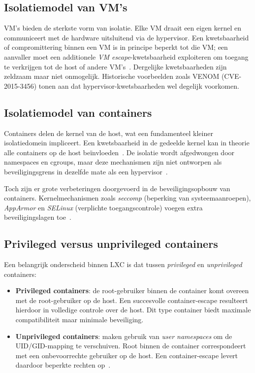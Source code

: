 \subsection{Isolatiemodel van VM's}
\label{subsec:isolatie-vms}

VM's bieden de sterkste vorm van isolatie. Elke VM draait een eigen kernel en communiceert met de hardware uitsluitend via de hypervisor. Een kwetsbaarheid of compromittering binnen een VM is in principe beperkt tot die VM; een aanvaller moet een additionele \textit{VM escape}-kwetsbaarheid exploiteren om toegang te verkrijgen tot de host of andere VM's~\autocite{ArXiv2021Isolation}. Dergelijke kwetsbaarheden zijn zeldzaam maar niet onmogelijk. Historische voorbeelden zoals VENOM (CVE-2015-3456) tonen aan dat hypervisor-kwetsbaarheden wel degelijk voorkomen.

\subsection{Isolatiemodel van containers}
\label{subsec:isolatie-containers}

Containers delen de kernel van de host, wat een fundamenteel kleiner isolatiedomein impliceert. Een kwetsbaarheid in de gedeelde kernel kan in theorie alle containers op de host beïnvloeden~\autocite{Aquasec2024}. De isolatie wordt afgedwongen door namespaces en cgroups, maar deze mechanismen zijn niet ontworpen als beveiligingsgrens in dezelfde mate als een hypervisor~\autocite{Infosec2021}.

Toch zijn er grote verbeteringen doorgevoerd in de beveiligingsopbouw van containers. Kernelmechanismen zoals \textit{seccomp} (beperking van systeemaanroepen), \textit{AppArmor} en \textit{SELinux} (verplichte toegangscontrole) voegen extra beveiligingslagen toe~\autocite{SecurityLabs2023}.

\subsection{Privileged versus unprivileged containers}
\label{subsec:privileged-unprivileged}

Een belangrijk onderscheid binnen LXC is dat tussen \textit{privileged} en \textit{unprivileged} containers:

\begin{itemize}
    \item \textbf{Privileged containers}: de root-gebruiker binnen de container komt overeen met de root-gebruiker op de host. Een succesvolle container-escape resulteert hierdoor in volledige controle over de host. Dit type container biedt maximale compatibiliteit maar minimale beveiliging.
    \item \textbf{Unprivileged containers}: maken gebruik van \textit{user namespaces} om de UID/GID-mapping te verschuiven. Root binnen de container correspondeert met een onbevoorrechte gebruiker op de host. Een container-escape levert daardoor beperkte rechten op~\autocite{SecurityLabs2023}.
\end{itemize}

